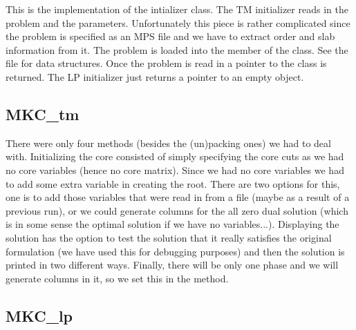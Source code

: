 This is the implementation of the intializer class. The TM initializer reads
in the problem and the parameters. Unfortunately this piece is rather
complicated since the problem is specified as an MPS file and we have to
extract order and slab information from it. The problem is loaded into the
 member of the  class. See the 
file for data structures. Once the problem is read in a pointer to the 
 class is returned. The LP initializer just returns a pointer to
an empty  object.

\subsection{MKC\_tm}

There were only four methods (besides the (un)packing ones) we had to deal
with. Initializing the core consisted of simply specifying the core cuts as we
had no core variables (hence no core matrix). Since we had no core variables
we had to add some extra variable in creating the root. There are two options
for this, one is to add those variables that were read in from a file (maybe
as a result of a previous run), or we could generate columns for the all zero
dual solution (which is in some sense the optimal solution if we have no
variables...). Displaying the solution has the option to test the solution
that it really satisfies the original formulation (we have used this for
debugging purposes) and then the solution is printed in two different ways.
Finally, there will be only one phase and we will generate columns in it, so
we set this in the  method.

\subsection{MKC\_lp}





